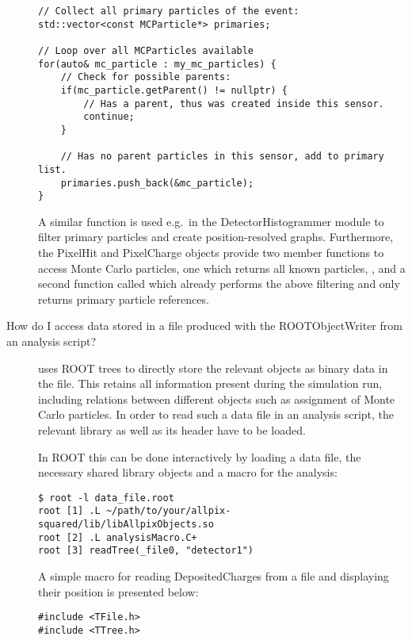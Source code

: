 \begin{description}
\begin{verbatim}
// Collect all primary particles of the event:
std::vector<const MCParticle*> primaries;

// Loop over all MCParticles available
for(auto& mc_particle : my_mc_particles) {
    // Check for possible parents:
    if(mc_particle.getParent() != nullptr) {
        // Has a parent, thus was created inside this sensor.
        continue;
    }

    // Has no parent particles in this sensor, add to primary list.
    primaries.push_back(&mc_particle);
}
\end{verbatim}

A similar function is used e.g.\ in the DetectorHistogrammer module to filter primary particles and create position-resolved graphs.
Furthermore, the PixelHit and PixelCharge objects provide two member functions to access Monte Carlo particles, one which returns all known particles, , and a second function called  which already performs the above filtering and only returns primary particle references.
\item[How do I access data stored in a file produced with the ROOTObjectWriter from an analysis script?]
\apsq uses ROOT trees to directly store the relevant \CPP objects as binary data in the file. This retains all information present during the simulation run, including relations between different objects such as assignment of Monte Carlo particles.
In order to read such a data file in an analysis script, the relevant \CPP library as well as its header have to be loaded.

In ROOT this can be done interactively by loading a data file, the necessary shared library objects and a macro for the analysis:

\begin{verbatim}
$ root -l data_file.root
root [1] .L ~/path/to/your/allpix-squared/lib/libAllpixObjects.so
root [2] .L analysisMacro.C+
root [3] readTree(_file0, "detector1")
\end{verbatim}

A simple macro for reading DepositedCharges from a file and displaying their position is presented below:

\begin{verbatim}
#include <TFile.h>
#include <TTree.h>


\end{verbatim}
\end{description}
